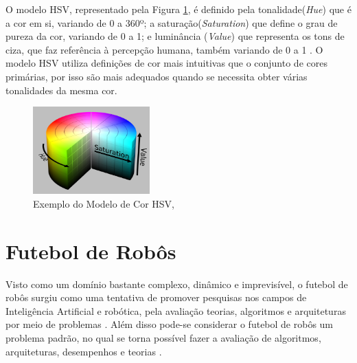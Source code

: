 O modelo HSV, representado pela Figura \ref{fig:ModeloHSV}, é definido pela tonalidade({\it Hue}) que é a cor em si, variando de 0 a 360º; a saturação({\it Saturation}) que define o grau de pureza da cor, variando de 0 a 1; e luminância ({\it Value}) que representa os tons de ciza, que faz referência à percepção humana, também variando de 0 a 1 \cite{Leao:2005, Azevedo:2003}.
O modelo HSV utiliza definições de cor mais intuitivas que o conjunto de cores primárias, por isso são mais adequados quando se necessita obter várias tonalidades da mesma cor.

\begin{figure}[!h]
	\centering
	\includegraphics[width=0.4\textwidth]{hsv.pdf}
	
	\caption{Exemplo do Modelo de Cor HSV, }
	\label{fig:ModeloHSV}
\end{figure} 


\section{Futebol de Robôs}
 Visto como um domínio bastante complexo, dinâmico e imprevisível, o futebol de robôs surgiu como uma tentativa de promover pesquisas nos campos de Inteligência Artificial e robótica, pela avaliação teorias, algoritmos e arquiteturas por meio de problemas \cite{FariaIEEE2006,Costa:2000,Kitano:1997}. Além disso pode-se considerar o futebol de robôs um problema padrão, no qual se torna possível fazer a avaliação de algoritmos, arquiteturas, desempenhos e teorias \cite{Faria2006}.

